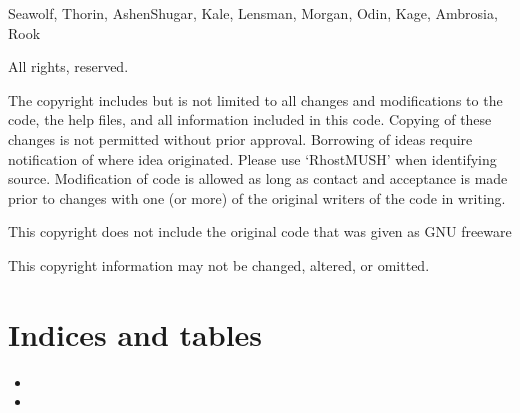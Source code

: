 \documentclass[letterpaper,10pt,english]{sphinxmanual}
\begin{document}
\sphinxAtStartPar
Seawolf, Thorin, Ashen\sphinxhyphen{}Shugar, Kale, Lensman, Morgan, Odin, Kage, Ambrosia, Rook

\sphinxAtStartPar
All rights, reserved.

\sphinxAtStartPar
The copyright includes but is not limited to all changes and modifications to
the code, the help files, and all information included in this code.
Copying of these changes is not permitted without prior approval.
Borrowing of ideas require notification of where idea originated.
Please use ‘RhostMUSH’ when identifying source. Modification of code is allowed
as long as contact and acceptance is made prior to changes with one (or more) of
the original writers of the code in writing.

\sphinxAtStartPar
This copyright does not include the original code that was given as GNU freeware

\sphinxAtStartPar
This copyright information may not be changed, altered, or omitted.


\chapter{Indices and tables}
\label{\detokenize{index:indices-and-tables}}\begin{itemize}
\item {} 
\sphinxAtStartPar
{}

\item {} 
\sphinxAtStartPar
{}

\end{itemize}



\renewcommand{\indexname}{Index}
\printindex
\end{document}
